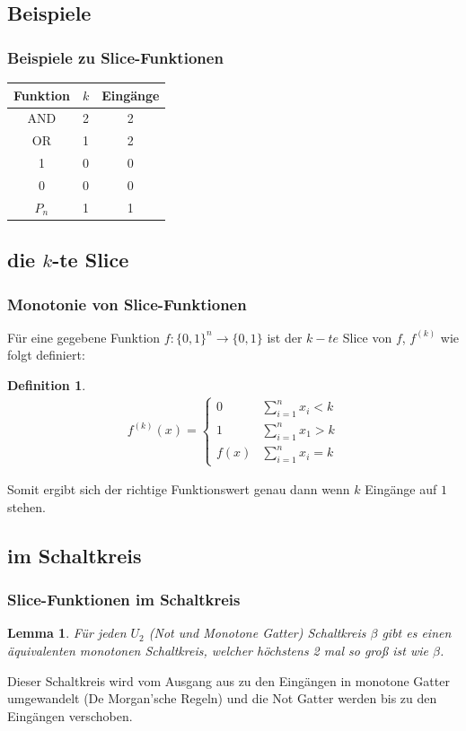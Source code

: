 \documentclass[hyperref={pdfpagelabels=false}]{beamer} %
\newtheorem{defin}{Definition}
\newtheorem{lem}{Lemma}
\begin{document}
  \subsection{Beispiele}
  \begin{frame}
    \frametitle{Beispiele zu Slice-Funktionen}
      \begin{tabular}[t]{|c|c|c|} \hline
        Funktion  & $k$   & Eing\"ange\\ \hline
        AND       & 2     & 2\\
        OR        & 1     & 2\\
        1         & 0     & 0\\ %
        0         & 0     & 0\\ %
        $P_{n}$   & 1     & 1\\ \hline
      \end{tabular}
  \end{frame}


  \subsection*{die $k$-te Slice}
  \begin{frame}
    \frametitle{Monotonie von Slice-Funktionen}
    Für eine gegebene Funktion $f:\{0,1\}^n \rightarrow \{0,1\}$ ist der $k-te$ Slice von $f$, $f^{(k)}$ wie folgt definiert:\\
    \begin{defin}
      \begin{align*}
        f^{(k)}(x) =
        \begin{cases}
          0 & \sum\nolimits_{i=1}^{n} x_i < k\\
          1 & \sum\nolimits_{i=1}^{n} x_1 > k\\
          f(x) & \sum\nolimits_{i=1}^{n} x_i = k
        \end{cases}
      \end{align*}
    \end{defin}
    Somit ergibt sich der richtige Funktionswert genau dann wenn $k$ Eing\"ange auf $1$ stehen.
  \end{frame}

  \subsection{im Schaltkreis}
  \begin{frame}%
    \frametitle{Slice-Funktionen im Schaltkreis}
    \begin{lem}
      Für jeden $U_2$ (Not und Monotone Gatter) Schaltkreis $\beta$ gibt es einen äquivalenten monotonen Schaltkreis, welcher höchstens
      2 mal so groß ist wie $\beta$.
    \end{lem}
    Dieser Schaltkreis wird vom Ausgang aus zu den Eing\"angen in monotone Gatter umgewandelt (De Morgan’sche Regeln) und die Not Gatter werden bis zu den Eing\"angen verschoben.
  \end{frame}
\end{document}
